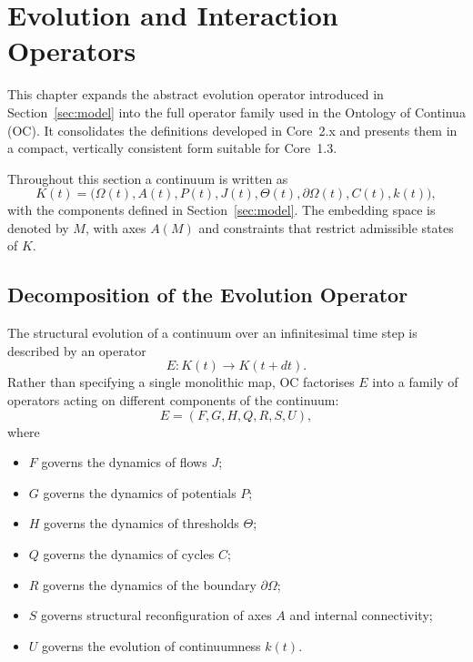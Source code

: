 
\section{Evolution and Interaction Operators}
\label{sec:operators-full}

This chapter expands the abstract evolution operator introduced in
Section~\ref{sec:model} into the full operator family used in the Ontology of
Continua (OC). It consolidates the definitions developed in Core~2.x and
presents them in a compact, vertically consistent form suitable for Core~1.3.

Throughout this section a continuum is written as
\[
  K(t) =
  \big(
    \Omega(t), A(t), P(t), J(t),
    \Theta(t), \partial\Omega(t), C(t), k(t)
  \big),
\]
with the components defined in Section~\ref{sec:model}. The embedding space is
denoted by \(M\), with axes \(A(M)\) and constraints that restrict admissible
states of \(K\).

\subsection{Decomposition of the Evolution Operator}

The structural evolution of a continuum over an infinitesimal time step is
described by an operator
\[
  E : K(t) \longrightarrow K(t+dt).
\]
Rather than specifying a single monolithic map, OC factorises \(E\) into a
family of operators acting on different components of the continuum:
\[
  E = (F, G, H, Q, R, S, U),
\]
where
\begin{itemize}
  \item \(F\) governs the dynamics of flows \(J\);
  \item \(G\) governs the dynamics of potentials \(P\);
  \item \(H\) governs the dynamics of thresholds \(\Theta\);
  \item \(Q\) governs the dynamics of cycles \(C\);
  \item \(R\) governs the dynamics of the boundary \(\partial\Omega\);
  \item \(S\) governs structural reconfiguration of axes \(A\) and internal
        connectivity;
  \item \(U\) governs the evolution of continuumness \(k(t)\).
\end{itemize}

